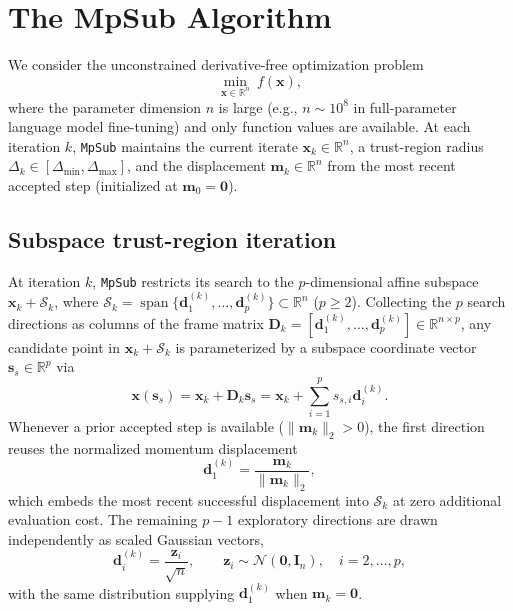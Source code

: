 \documentclass[smallextended]{svjour3}
\newcommand{\bx}{\bm{x}}
\newcommand{\bd}{\bm{d}}
\newcommand{\bz}{\bm{z}}
\newcommand{\bs}{\bm{s}}
\begin{document}
\section{The MpSub Algorithm}
\label{section:MpSub}

We consider the unconstrained derivative-free optimization problem
\[
\min_{\bx \in \mathbb{R}^n}\ f(\bx),
\]
where the parameter dimension $n$ is large (e.g., $n \sim 10^8$ in full-parameter language model fine-tuning) and only function values are available. At each iteration $k$, \texttt{MpSub} maintains the current iterate $\bx_k \in \mathbb{R}^n$, a trust-region radius $\Delta_k \in [\Delta_{\min}, \Delta_{\max}]$, and the displacement $\bm m_k \in \mathbb{R}^n$ from the most recent accepted step (initialized at $\bm m_0 = \bm 0$).

\subsection{Subspace trust-region iteration}
\label{subsec:construction}
\label{subsec:gradient}
\label{subsec:trial}
\label{subsec:update}

At iteration $k$, \texttt{MpSub} restricts its search to the $p$-dimensional affine subspace $\bx_k + \mathcal{S}_k$, where $\mathcal{S}_k = \operatorname{span}\{\bd_1^{(k)}, \ldots, \bd_p^{(k)}\} \subset \mathbb{R}^n$ ($p \ge 2$). Collecting the $p$ search directions as columns of the frame matrix $\bm D_k = [\bd_1^{(k)}, \ldots, \bd_p^{(k)}] \in \mathbb{R}^{n \times p}$, any candidate point in $\bx_k + \mathcal{S}_k$ is parameterized by a subspace coordinate vector $\bs_s \in \mathbb{R}^p$ via
\[
\bx(\bs_s) = \bx_k + \bm D_k \bs_s = \bx_k + \sum_{i=1}^p s_{s,i} \bd_i^{(k)}.
\]
Whenever a prior accepted step is available ($\|\bm m_k\|_2 > 0$), the first direction reuses the normalized momentum displacement
\begin{equation}
\bd_1^{(k)} = \frac{\bm m_k}{\|\bm m_k\|_2},
\label{eq:momentum_dir}
\end{equation}
which embeds the most recent successful displacement into $\mathcal{S}_k$ at zero additional evaluation cost. The remaining $p-1$ exploratory directions are drawn independently as scaled Gaussian vectors,
\begin{equation}
\bd_i^{(k)} = \frac{\bz_i}{\sqrt{n}}, \qquad \bz_i \sim \mathcal{N}(\bm{0}, \bm{I}_n), \quad i = 2, \ldots, p,
\label{eq:random_dirs}
\end{equation}
with the same distribution supplying $\bd_1^{(k)}$ when $\bm m_k = \bm 0$.
\end{document}
